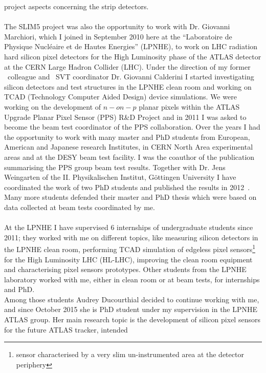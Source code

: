 project aspects concerning the strip detectors. 
\\
\\
The SLIM5 project was also the opportunity to work with Dr. Giovanni Marchiori, which I  joined in 
September 2010 here 
at the ``Laboratoire de Physique Nucl\'eaire et de Hautes Energies'' (LPNHE), to work on LHC
radiation hard silicon pixel detectors for the High Luminosity phase of the  ATLAS detector at the CERN  
Large Hadron Collider (LHC). Under the direction of my former \babar\ colleague and \babar\ SVT coordinator
Dr. Giovanni Calderini I started investigating silicon detectors and test structures in the LPNHE clean room 
  and working on TCAD (Technology Computer Aided Design) device simulations.
We were working on the development of $n-on-p$ planar pixels within the ATLAS Upgrade Planar Pixel 
Sensor (PPS) R\&D Project and in 2011 I was asked to become the beam test coordinator of the PPS 
collaboration. Over the years I had the opportunity to work with many master and PhD students from
 European, American and Japanese research Institutes, in CERN North Area experimental areas and at the DESY 
 beam test facility. 
I was the coauthor of the publication summarising  the PPS group beam test 
results. Together with Dr. Jens Weingarten of the  II. Physikalischen Institut, G\"ottingen University 
I have coordinated the work of two PhD students and published the results in 2012~\cite{1748-0221-7-10-P10028}. \\
Many more students defended their master and PhD thesis which were based on data collected at 
beam tests coordinated by me.
\\ \\
At the LPNHE I have supervised  6 internships of undergraduate students since 2011; 
they worked with me on different topics, like measuring silicon detectors
 in the LPNHE clean room, performing TCAD 
simulation of edgeless pixel sensors\footnote{sensor characterised by a very slim un-instrumented area at 
the detector periphery}~\cite{bib:nim2012} for the 
High Luminosity LHC (HL-LHC), improving the clean room equipment  and characterising pixel sensors 
prototypes. Other students from the LPNHE laboratory worked with me, either
in clean room or at beam tests, for internships and PhD.
\\
Among those students Audrey Ducourthial decided to continue working with me, and since October 2015 she is 
 PhD student under my supervision in the LPNHE ATLAS group. 
Her main research topic is the development of silicon pixel sensors for the future ATLAS tracker, intended 
